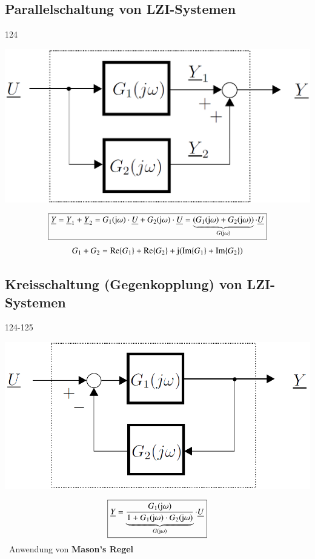 \subsection{Parallelschaltung von LZI-Systemen}{124}

\begin{center}
    \includegraphics[width=0.5\columnwidth]{images/frequenzgang_parallelschaltung.png}
\end{center}
$$ \boxed{ \underline{Y} = \underline{Y}_1 + \underline{Y}_2 = G_1(\mathrm{j} \omega) \cdot \underline{U} + G_2(\mathrm{j} \omega) \cdot \underline{U} 
    = \underbrace{(G_1(\mathrm{j} \omega) + G_2(\mathrm{j} \omega))}_{G(\mathrm{j} \omega)} \cdot \underline{U}} $$
$$ G_1 + G_2 = \mathrm{Re}\{ G_1 \} + \mathrm{Re}\{ G_2 \} + \mathrm{j} ( \mathrm{Im}\{ G_1 \} + \mathrm{Im}\{ G_2 \}) $$


\subsection{Kreisschaltung (Gegenkopplung) von LZI-Systemen}{124-125}

\begin{minipage}[c]{0.5\columnwidth}
    \includegraphics[width=\columnwidth]{images/frequenzgang_kreisschaltung.png}
\end{minipage}
\hfill
\begin{minipage}[c]{0.48\columnwidth}
    $$ \boxed{ \underline{Y} = \underbrace{\frac{G_1(\mathrm{j} \omega)}{1 + G_1(\mathrm{j} \omega) \cdot G_2(\mathrm{j} \omega)}}_{G(\mathrm{j} \omega)} \cdot \underline{U}} $$
    \textrightarrow\ Anwendung von \textbf{Mason's Regel}
\end{minipage}



